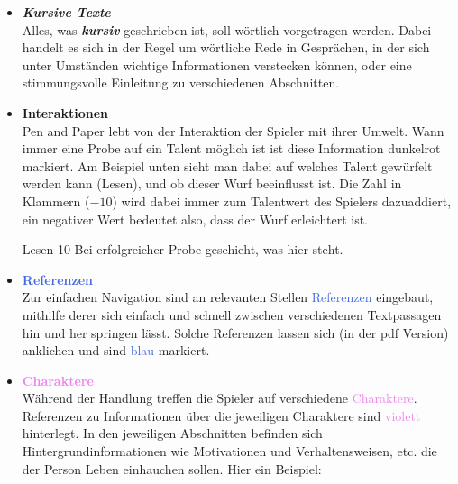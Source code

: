 \begin{itemize}
  \item \textbf{\textit{Kursive Texte}} \\
  Alles, was \textbf{\textit{kursiv}} geschrieben ist, soll wörtlich vorgetragen werden. Dabei handelt es sich in der Regel
  um wörtliche Rede in Gesprächen, in der sich unter Umständen wichtige Informationen verstecken können, oder eine
  stimmungsvolle Einleitung zu verschiedenen Abschnitten.


  \item \textcolor{RoyalRed}{\textbf{Interaktionen}} \\
  Pen and Paper lebt von der \textcolor{RoyalRed}{Interaktion} der Spieler mit ihrer Umwelt. Wann immer eine Probe auf ein Talent
  möglich ist ist diese Information \textcolor{RoyalRed}{dunkelrot} markiert. Am Beispiel unten sieht man dabei auf welches Talent
  gewürfelt werden kann (Lesen), und ob dieser Wurf beeinflusst ist. Die Zahl in Klammern ($-10$) wird dabei immer zum Talentwert
  des Spielers dazuaddiert, ein negativer Wert bedeutet also, dass der Wurf erleichtert ist.

  \begin{probe}{Lesen}{-10}
  Bei erfolgreicher Probe geschieht, was hier steht.
  \end{probe}

  \item \textcolor{RoyalBlue}{\textbf{Referenzen}} \\
  Zur einfachen Navigation sind an relevanten Stellen \textcolor{RoyalBlue}{Referenzen} eingebaut, mithilfe derer sich einfach und
  schnell zwischen verschiedenen Textpassagen hin und her springen lässt. Solche Referenzen lassen sich (in der pdf
  Version) anklichen und sind \textcolor{RoyalBlue}{blau} markiert.

  \item \textcolor{violet}{\textbf{Charaktere}} \\
  Während der Handlung treffen die Spieler auf verschiedene \textcolor{violet}{Charaktere}. Referenzen zu Informationen über
  die jeweiligen Charaktere sind \textcolor{violet}{violett} hinterlegt. In den jeweiligen Abschnitten befinden sich
  Hintergrundinformationen wie Motivationen und Verhaltensweisen, etc. die der Person Leben einhauchen sollen. Hier ein
  Beispiel:

  \begin{centering}
    \noindent{}
  \end{centering}

\end{itemize}
